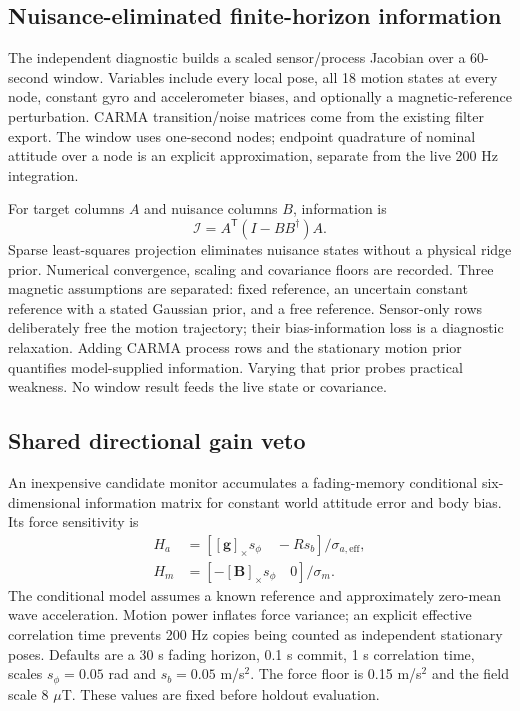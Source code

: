 \documentclass[conference]{IEEEtran}
\newcommand{\vc}[1]{\bm{#1}}
\newcommand{\sk}[1]{[#1]_\times}
\newcommand{\tr}{^{\mathsf T}}
\begin{document}
\subsection{Nuisance-eliminated finite-horizon information}
The independent diagnostic builds a scaled sensor/process Jacobian over a
60-second window. Variables include every local pose, all 18 motion states
at every node, constant gyro and accelerometer biases, and optionally a
magnetic-reference perturbation. CARMA transition/noise matrices come from
the existing filter export. The window uses one-second nodes; endpoint
quadrature of nominal attitude over a node is an explicit approximation,
separate from the live 200 Hz integration.

For target columns $A$ and nuisance columns $B$, information is
\begin{equation}
 \mathcal I=A\tr(I-BB^\dagger)A.
\end{equation}
Sparse least-squares projection eliminates nuisance states without a
physical ridge prior. Numerical convergence, scaling and covariance floors
are recorded. Three magnetic assumptions are separated: fixed reference,
an uncertain constant reference with a stated Gaussian prior, and a free
reference. Sensor-only rows deliberately free the motion trajectory; their
bias-information loss is a diagnostic relaxation. Adding CARMA process rows
and the stationary motion prior quantifies model-supplied information.
Varying that prior probes practical weakness. No window result feeds the
live state or covariance.

\subsection{Shared directional gain veto}
An inexpensive candidate monitor accumulates a fading-memory conditional
six-dimensional information matrix for constant world attitude error and
body bias. Its force sensitivity is
\begin{equation}
 \begin{aligned}
 H_a&=[\sk{\vc g}s_\phi\quad -Rs_b]/\sigma_{a,\mathrm{eff}},\\
 H_m&=[-\sk{\vc B}s_\phi\quad0]/\sigma_m.
 \end{aligned}
\end{equation}
The conditional model assumes a known reference and approximately
zero-mean wave acceleration. Motion power inflates force variance; an
explicit effective correlation time prevents 200 Hz copies being counted
as independent stationary poses. Defaults are a 30 s fading horizon, 0.1 s
commit, 1 s correlation time, scales $s_\phi=0.05$ rad and
$s_b=0.05$ m/s$^2$. The force floor is 0.15 m/s$^2$ and the field scale
8 $\mu$T. These values are fixed before holdout evaluation.
\end{document}
